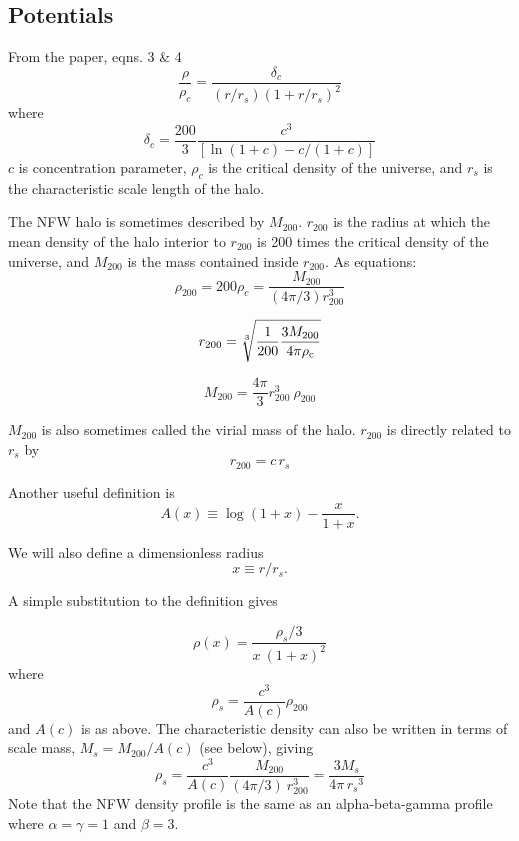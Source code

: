 \subsection{Potentials}\label{potentials}

From the \citet{nfw1996} paper, eqns. 3 \& 4 \begin{equation}
\frac{\rho}{\rho_c} = \frac{\delta_c}{(r/r_s)(1+r/r_s)^2}
\end{equation} where \begin{equation}
\delta_c = \frac{200}{3}\frac{c^3}{[\ln(1+c)-c/(1+c)]}
\end{equation} \(c\) is concentration parameter, \(\rho_c\) is the
critical density of the universe, and \(r_s\) is the characteristic
scale length of the halo.

The NFW halo is sometimes described by \(M_{200}\). \(r_{200}\) is the
radius at which the mean density of the halo interior to \(r_{200}\) is
200 times the critical density of the universe, and \(M_{200}\) is the
mass contained inside \(r_{200}\). As equations: \begin{equation}
\rho_{200} = 200\rho_{c} = \frac{M_{200}}{(4\pi/3) r_{200}^3}
\end{equation}

\begin{equation}
r_{200} = \sqrt[3]{\frac{1}{200}\frac{3M_{200}}{4\pi \rho_{\rm c
}}}
\end{equation}

\begin{equation}
M_{200} = \frac{4\pi}{3} r_{200}^3\ \rho_{200}
\end{equation}

\(M_{200}\) is also sometimes called the virial mass of the halo.
\(r_{200}\) is directly related to \(r_s\) by \begin{equation}
r_{200} = c\,r_s
\end{equation}

Another useful definition is \begin{equation}
A(x) \equiv \log (1+x) - \frac{x}{1+x}.
\end{equation}

We will also define a dimensionless radius \begin{equation}
x \equiv r/r_s.
\end{equation}

A simple substitution to the definition gives

\begin{equation}
\rho(x) =  \frac{\rho_s/3}{x\ (1+x)^2}
\end{equation} where \begin{equation}
\rho_s = \frac{c^3}{A(c)} \rho_{200}
\end{equation} and \(A(c)\) is as above. The characteristic density can
also be written in terms of scale mass, \(M_s = M_{200}/{A(c)}\) (see
below), giving \begin{equation}
\rho_s = \frac{c^3}{A(c)} \frac{M_{200}}{(4\pi/3)\ r_{200}^3}  = \frac{3M_s}{4\pi\, {r_s}^3}
\end{equation} Note that the NFW density profile is the same as an
alpha-beta-gamma profile where \(\alpha=\gamma=1\) and \(\beta =3\).

